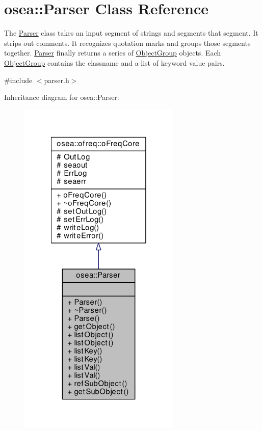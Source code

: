 \hypertarget{classosea_1_1_parser}{\section{osea\-:\-:Parser Class Reference}
\label{classosea_1_1_parser}
}


The \hyperlink{classosea_1_1_parser}{Parser} class takes an input segment of strings and segments that segment. It strips out comments. It recognizes quotation marks and groups those segments together. \hyperlink{classosea_1_1_parser}{Parser} finally returns a series of \hyperlink{classosea_1_1_object_group}{Object\-Group} objects. Each \hyperlink{classosea_1_1_object_group}{Object\-Group} contains the classname and a list of keyword value pairs.  




{\ttfamily \#include $<$parser.\-h$>$}



Inheritance diagram for osea\-:\-:Parser\-:
\nopagebreak
\begin{figure}[H]
\begin{center}
\leavevmode
\includegraphics[width=218pt]{classosea_1_1_parser__inherit__graph}
\end{center}
\end{figure}
